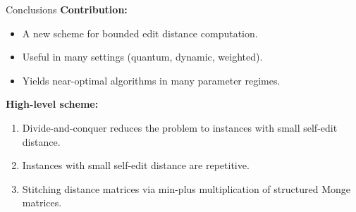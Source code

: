 \documentclass[sans-serif,aspectratio=169]{beamer}
\begin{document}
\begin{frame}{Conclusions}
    \textbf{Contribution:}
    \begin{itemize}
        \item A new scheme for bounded edit distance computation.
        \item Useful in many settings (quantum, dynamic, weighted).
        \item Yields near-optimal algorithms in many parameter regimes.
    \end{itemize}

    \bigskip
    \pause
    \textbf{High-level scheme:}
    \begin{enumerate}
        \item Divide-and-conquer reduces the problem to instances with small self-edit distance.
        \item Instances with small self-edit distance are repetitive.
        \item Stitching distance matrices via min-plus multiplication of structured Monge matrices.
    \end{enumerate}

\end{frame}
\end{document}
